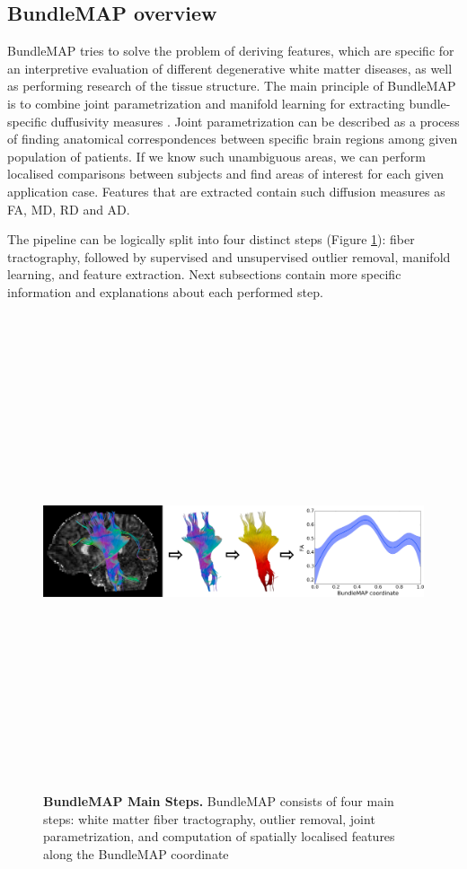\documentclass[thesis.tex]{subfiles}
\begin{document}
\subsection{BundleMAP overview}
BundleMAP tries to solve the problem of deriving features, which are specific for an interpretive evaluation of different degenerative white matter diseases, as well as performing research of the tissue structure. The main principle of BundleMAP is to combine joint parametrization and manifold learning for extracting bundle-specific duffusivity measures \cite{Khatami2017BundleMap}. Joint parametrization can be described as a process of finding anatomical correspondences between specific brain regions among given population of patients. If we know such unambiguous areas, we can perform localised comparisons between subjects and find areas of interest for each given application case. Features that are extracted contain such diffusion measures as FA, MD, RD and AD.


The pipeline can be logically split into four distinct steps (Figure \ref{fig:bundlemap-steps}): fiber tractography, followed by supervised and unsupervised outlier removal, manifold learning, and feature extraction. Next subsections contain more specific information and explanations about each performed step.

\begin{figure}
\centering
\includegraphics[width=14cm,height=14cm,keepaspectratio]{thesis_radomskyi/images/bundlemap_steps.jpg}
\caption{\textbf{BundleMAP Main Steps.} BundleMAP consists of four main steps: white matter fiber tractography, outlier removal, joint parametrization, and computation of spatially localised features along the BundleMAP coordinate \cite{Khatami2017BundleMap}}
\label{fig:bundlemap-steps}
\end{figure}
\end{document}
